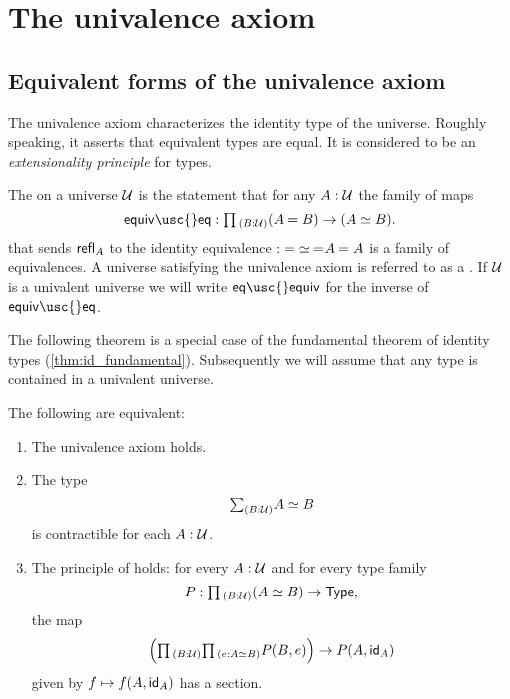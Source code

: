 \section{The univalence axiom}

\subsection{Equivalent forms of the univalence axiom}

The univalence axiom characterizes the identity type of the universe. Roughly speaking, it asserts that equivalent types are equal. It is considered to be an \emph{extensionality principle} for types.

\begin{defn}
  The  on a universe $\UU$ is the statement that for any $A:\UU$ the family of maps
\begin{equation*}
\mathsf{equiv\usc{}eq} : \prd{B:\UU} (\id{A}{B})\to(\eqv{A}{B}).
\end{equation*}
that sends $\refl{A}$ to the identity equivalence $\id:\eqv{A}{A}$ is a family of equivalences. A universe satisfying the univalence axiom is referred to as a . If $\UU$ is a univalent universe we will write
$\mathsf{eq\usc{}equiv}$
for the inverse of $\mathsf{equiv\usc{}eq}$.
\end{defn}

The following theorem is a special case of the fundamental theorem of identity types (\cref{thm:id_fundamental}). Subsequently we will assume that any type is contained in a univalent universe.

\begin{thm}\label{thm:univalence}
The following are equivalent:
\begin{enumerate}
\item The univalence axiom holds.
\item The type
\begin{equation*}
\sm{B:\UU}\eqv{A}{B}
\end{equation*}
is contractible for each $A:\UU$.
\item The principle of  holds: for every $A:\UU$ and for every type family
\begin{equation*}
P:\prd{B:\UU} (\eqv{A}{B})\to \mathsf{Type},
\end{equation*}
the map
\begin{equation*}
\Big(\prd{B:\UU}{e:\eqv{A}{B}}P(B,e)\Big)\to P(A,\idfunc[A])
\end{equation*}
given by $f\mapsto f(A,\idfunc[A])$ has a section.
\end{enumerate}
\end{thm}

